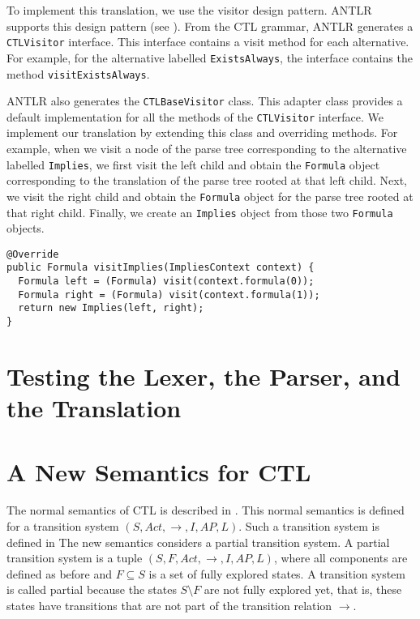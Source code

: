 \documentclass[12pt]{article}
\theoremstyle{definition}
\begin{document}
To implement this translation, we use the visitor design pattern.  ANTLR supports this design pattern (see \cite[Section~7.3]{P13}).  From the CTL grammar, ANTLR generates a \lstinline{CTLVisitor} interface.  This interface contains a visit method for each alternative.  For example, for the alternative labelled \lstinline{ExistsAlways}, the interface contains the method \lstinline{visitExistsAlways}.

ANTLR also generates the \lstinline{CTLBaseVisitor} class.  This adapter class provides a default implementation for all the methods of the \lstinline{CTLVisitor} interface.  We implement our translation by extending this class and overriding methods.  For example, when we visit a node of the parse tree corresponding to the alternative labelled \lstinline{Implies}, we first visit the left child and obtain the \lstinline{Formula} object corresponding to the translation of the parse tree rooted at that left child.  Next, we visit the right child and obtain the \lstinline{Formula} object for the parse tree rooted at that right child.  Finally, we create an \lstinline{Implies} object from those two \lstinline{Formula} objects.

\begin{lstlisting}
@Override
public Formula visitImplies(ImpliesContext context) {
  Formula left = (Formula) visit(context.formula(0));
  Formula right = (Formula) visit(context.formula(1));
  return new Implies(left, right);
}
\end{lstlisting}

\section{Testing the Lexer, the Parser, and the Translation}




\section{A New Semantics for CTL}

The normal semantics of CTL is described in \cite[Section~6.2.2]{BK08}.  This normal semantics is defined for a transition system $(S, Act, \rightarrow, I, AP, L)$.  Such a transition system is defined in \cite[Definition~2.1]{BK08}  The new semantics considers a partial transition system.  A partial transition system is a tuple $(S, F, Act, \rightarrow, I, AP, L)$, where all components are defined as before and $F \subseteq S$ is a set of fully explored states.  A transition system is called partial because the states $S \setminus F$ are not fully explored yet, that is, these states have transitions that are not part of the transition relation $\rightarrow$.  
\end{document}
